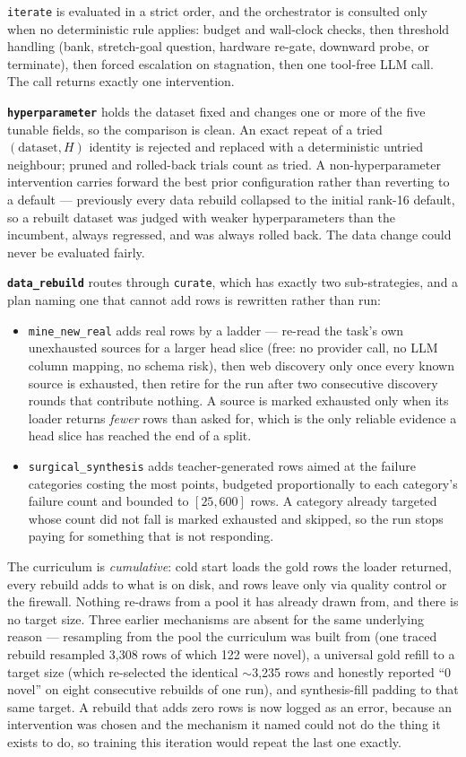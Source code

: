 \documentclass[sigconf,10pt]{acmart}
\newcommand{\squishlist}{\begin{itemize}[itemsep=1pt,parsep=2pt,topsep=3pt,partopsep=0pt,leftmargin=0em,itemindent=1em,labelwidth=1em,labelsep=0.5em]}
\newcommand{\squishend}{\end{itemize}}
\begin{document}
\texttt{iterate} is evaluated in a strict order, and the orchestrator is consulted only when
no deterministic rule applies: budget and wall-clock checks, then threshold handling (bank,
stretch-goal question, hardware re-gate, downward probe, or terminate), then forced escalation
on stagnation, then one tool-free LLM call. The call returns exactly one intervention.

\textbf{\texttt{hyperparameter}} holds the dataset fixed and changes one or more of the five
tunable fields, so the comparison is clean. An exact repeat of a tried
$(\text{dataset}, H)$ identity is rejected and replaced with a deterministic untried
neighbour; pruned and rolled-back trials count as tried. A non-hyperparameter intervention
carries forward the best prior configuration rather than reverting to a default --- previously
every data rebuild collapsed to the initial rank-16 default, so a rebuilt dataset was judged
with weaker hyperparameters than the incumbent, always regressed, and was always rolled back.
The data change could never be evaluated fairly.

\textbf{\texttt{data\_rebuild}} routes through \texttt{curate}, which has exactly two
sub-strategies, and a plan naming one that cannot add rows is rewritten rather than run:
\squishlist
\item \texttt{mine\_new\_real} adds real rows by a ladder --- re-read the task's own
unexhausted sources for a larger head slice (free: no provider call, no LLM column mapping,
no schema risk), then web discovery only once every known source is exhausted, then retire
for the run after two consecutive discovery rounds that contribute nothing. A source is
marked exhausted only when its loader returns \emph{fewer} rows than asked for, which is the
only reliable evidence a head slice has reached the end of a split.
\item \texttt{surgical\_synthesis} adds teacher-generated rows aimed at the failure categories
costing the most points, budgeted proportionally to each category's failure count and bounded
to $[25, 600]$ rows. A category already targeted whose count did not fall is marked
exhausted and skipped, so the run stops paying for something that is not responding.
\squishend
The curriculum is \emph{cumulative}: cold start loads the gold rows the loader returned,
every rebuild adds to what is on disk, and rows leave only via quality control or the
firewall. Nothing re-draws from a pool it has already drawn from, and there is no target
size. Three earlier mechanisms are absent for the same underlying reason --- resampling from
the pool the curriculum was built from (one traced rebuild resampled 3{,}308 rows of which 122
were novel), a universal gold refill to a target size (which re-selected the identical
$\sim$3{,}235 rows and honestly reported ``0 novel'' on eight consecutive rebuilds of one
run), and synthesis-fill padding to that same target. A rebuild that adds zero rows is now
logged as an error, because an intervention was chosen and the mechanism it named could not
do the thing it exists to do, so training this iteration would repeat the last one exactly.
\end{document}
